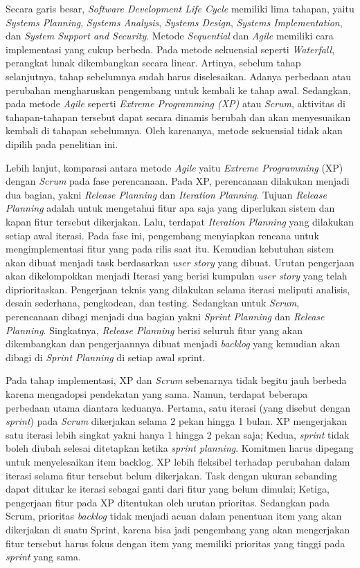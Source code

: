 Secara garis besar, \textit{Software Development Life Cycle} memiliki lima tahapan, yaitu \textit{Systems Planning}, \textit{Systems Analysis}, \textit{Systems Design}, \textit{Systems Implementation}, dan \textit{System Support and Security}. Metode \textit{Sequential} dan \textit{Agile} memiliki cara implementasi yang cukup berbeda. Pada metode sekuensial seperti \textit{Waterfall}, perangkat lunak dikembangkan secara linear. Artinya, sebelum tahap selanjutnya, tahap sebelumnya sudah harus diselesaikan. Adanya perbedaan atau perubahan mengharuskan pengembang untuk kembali ke tahap awal. Sedangkan, pada metode \textit{Agile} seperti \textit{Extreme Programming (XP)} atau \textit{Scrum}, aktivitas di tahapan-tahapan tersebut dapat secara dinamis berubah dan akan menyesuaikan kembali di tahapan sebelumnya. Oleh karenanya, metode sekuensial tidak akan dipilih pada penelitian ini.

Lebih lanjut, komparasi antara metode \textit{Agile} yaitu \textit{Extreme Programming} (XP) dengan \textit{Scrum} pada fase perencanaan. Pada XP, perencanaan dilakukan menjadi dua bagian, yakni \textit{Release Planning} dan \textit{Iteration Planning}. Tujuan \textit{Release Planning} adalah untuk mengetahui fitur apa saja yang diperlukan sistem dan kapan fitur tersebut dikerjakan. Lalu, terdapat \textit{Iteration Planning} yang dilakukan setiap awal iterasi. Pada fase ini, pengembang menyiapkan rencana untuk mengimplementasi fitur yang pada rilis saat itu. Kemudian kebutuhan sistem akan dibuat menjadi task berdasarkan \textit{user story} yang dibuat. Urutan pengerjaan akan dikelompokkan menjadi Iterasi yang berisi kumpulan \textit{user story} yang telah diprioritaskan. Pengerjaan teknis yang dilakukan selama iterasi meliputi analisis, desain sederhana, pengkodean, dan testing. Sedangkan untuk \textit{Scrum}, perencanaan dibagi menjadi dua bagian yakni \textit{Sprint Planning} dan \textit{Release Planning}. Singkatnya, \textit{Release Planning} berisi seluruh fitur yang akan dikembangkan dan pengerjaannya dibuat menjadi \textit{backlog} yang kemudian akan dibagi di \textit{Sprint Planning} di setiap awal sprint.

Pada tahap implementasi, XP dan \textit{Scrum} sebenarnya tidak begitu jauh berbeda karena mengadopsi pendekatan yang sama. Namun, terdapat beberapa perbedaan utama diantara keduanya. Pertama, satu iterasi (yang disebut dengan \textit{sprint}) pada \textit{Scrum} dikerjakan selama 2 pekan hingga 1 bulan. XP mengerjakan satu iterasi lebih singkat yakni hanya 1 hingga 2 pekan saja; Kedua, \textit{sprint} tidak boleh diubah selesai ditetapkan ketika \textit{sprint planning}. Komitmen harus dipegang untuk menyelesaikan item backlog. XP lebih fleksibel terhadap perubahan dalam iterasi selama fitur tersebut belum dikerjakan. Task dengan ukuran sebanding dapat ditukar ke iterasi sebagai ganti dari fitur yang belum dimulai; Ketiga, pengerjaan fitur pada XP ditentukan oleh urutan prioritas. Sedangkan pada Scrum, prioritas \textit{backlog} tidak menjadi acuan dalam penentuan item yang akan dikerjakan di suatu Sprint, karena bisa jadi pengembang yang akan mengerjakan fitur tersebut harus fokus dengan item yang memiliki prioritas yang tinggi pada \textit{sprint} yang sama. 

